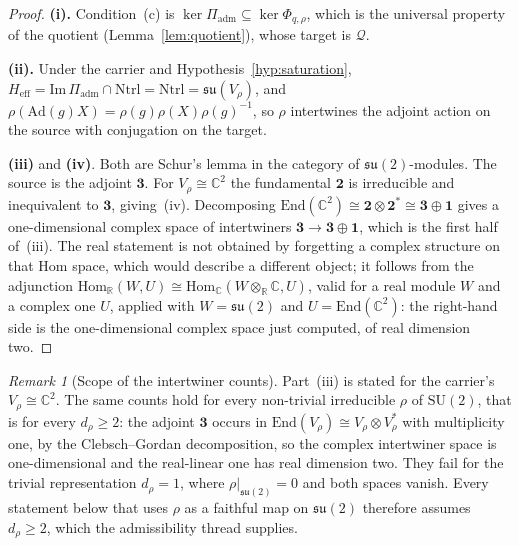 \documentclass[11pt,a4paper]{article}
\theoremstyle{remark}
\newtheorem{remark}[theorem]{Remark}
\begin{document}
  \begin{proof}
    \textbf{(i).}
    Condition~(c) is $\ker \Pi_{\mathrm{adm}} \subseteq \ker \Phi_{q,\rho}$, which is the universal
    property of the quotient (Lemma~\ref{lem:quotient}), whose target is $\mathcal{Q}$.

    \textbf{(ii).}
    Under the carrier and Hypothesis~\ref{hyp:saturation}, $H_{\mathrm{eff}} =
    \mathrm{Im}\,\Pi_{\mathrm{adm}} \cap \mathrm{Ntrl} = \mathrm{Ntrl} =
    \mathfrak{su}(V_\rho)$, and
    $\rho(\mathrm{Ad}(g)X) = \rho(g)\rho(X)\rho(g)^{-1}$, so $\rho$
    intertwines the adjoint action on the source with conjugation on the target.

    \textbf{(iii)} and \textbf{(iv)}.
    Both are Schur's lemma in the category of $\mathfrak{su}(2)$-modules.  The source is the adjoint
    $\mathbf{3}$.  For $V_\rho \cong \mathbb{C}^2$ the fundamental $\mathbf{2}$ is irreducible and
    inequivalent to $\mathbf{3}$, giving~(iv).  Decomposing
    $\mathrm{End}(\mathbb{C}^2) \cong \mathbf{2} \otimes \mathbf{2}^{*} \cong \mathbf{3} \oplus
    \mathbf{1}$ gives a one-dimensional complex space of intertwiners
    $\mathbf{3} \to \mathbf{3} \oplus \mathbf{1}$, which is the first half of~(iii).
    The real statement is not obtained by forgetting a complex structure on that Hom space, which
    would describe a different object; it follows from the adjunction
    $\mathrm{Hom}_{\mathbb{R}}(W, U) \cong \mathrm{Hom}_{\mathbb{C}}(W \otimes_{\mathbb{R}}
    \mathbb{C}, U)$, valid for a real module $W$ and a complex one $U$, applied with
    $W = \mathfrak{su}(2)$ and $U = \mathrm{End}(\mathbb{C}^2)$: the right-hand side is the
    one-dimensional complex space just computed, of real dimension two.
  \end{proof}

  \begin{remark}[Scope of the intertwiner counts]
    \label{rem:schur-scope}
    Part~(iii) is stated for the carrier's $V_\rho \cong \mathbb{C}^2$.
    The same counts hold for every non-trivial irreducible $\rho$ of $\mathrm{SU}(2)$, that is for
    every $d_\rho \geq 2$: the adjoint $\mathbf{3}$ occurs in
    $\mathrm{End}(V_\rho) \cong V_\rho \otimes V_\rho^{*}$ with multiplicity one, by the
    Clebsch--Gordan decomposition, so the complex intertwiner space is one-dimensional and the
    real-linear one has real dimension two.
    They fail for the trivial representation $d_\rho = 1$, where $\rho|_{\mathfrak{su}(2)} = 0$
    and both spaces vanish.
    Every statement below that uses $\rho$ as a faithful map on $\mathfrak{su}(2)$ therefore
    assumes $d_\rho \geq 2$, which the admissibility thread supplies.
  \end{remark}
\end{document}
